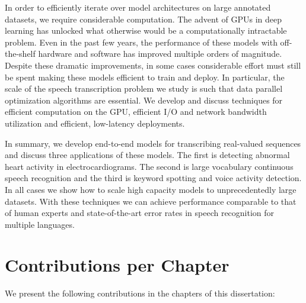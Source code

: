 In order to efficiently iterate over model architectures on large annotated
datasets, we require considerable computation. The advent of GPUs in deep
learning has unlocked what otherwise would be a computationally intractable
problem. Even in the past few years, the performance of these models with
off-the-shelf hardware and software has improved multiple orders of magnitude.
Despite these dramatic improvements, in some cases considerable effort must
still be spent making these models efficient to train and deploy.  In
particular, the scale of the speech transcription problem we study is such that
data parallel optimization algorithms are essential. We develop and discuss
techniques for efficient computation on the GPU, efficient I/O and network
bandwidth utilization and efficient, low-latency deployments.

In summary, we develop end-to-end models for transcribing real-valued sequences
and discuss three applications of these models. The first is detecting abnormal
heart activity in electrocardiograms. The second is large vocabulary continuous
speech recognition and the third is keyword spotting and voice activity
detection. In all cases we show how to scale high capacity models to
unprecedentedly large datasets. With these techniques we can achieve
performance comparable to that of human experts and state-of-the-art error
rates in speech recognition for multiple languages.

\section{Contributions per Chapter}

We present the following contributions in the chapters of this dissertation:

